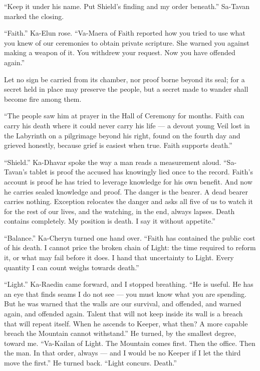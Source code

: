 ``Keep it under his name. Put Shield's finding and my order beneath.'' Sa-Tavan marked the closing.\par

``Faith.'' Ka-Elun rose. ``Va-Maera of Faith reported how you tried to use what you knew of our ceremonies to obtain private scripture. She warned you against making a weapon of it. You withdrew your request. Now you have offended again.''\par

\begin{scripture}
Let no sign be carried from its chamber, nor proof borne beyond its seal; for a secret held in place may preserve the people, but a secret made to wander shall become fire among them.
\end{scripture}

``The people saw him at prayer in the Hall of Ceremony for months. Faith can carry his death where it could never carry his life --- a devout young Veil lost in the Labyrinth on a pilgrimage beyond his right, found on the fourth day and grieved honestly, because grief is easiest when true. Faith supports death.''\par

``Shield.'' Ka-Dhavar spoke the way a man reads a measurement aloud. ``Sa-Tavan's tablet is proof the accused has knowingly lied once to the record. Faith's account is proof he has tried to leverage knowledge for his own benefit. And now he carries sealed knowledge and proof. The danger is the bearer. A dead bearer carries nothing. Exception relocates the danger and asks all five of us to watch it for the rest of our lives, and the watching, in the end, always lapses. Death contains completely. My position is death. I say it without appetite.''\par

``Balance.'' Ka-Cheryn turned one hand over. ``Faith has contained the public cost of his death. I cannot price the broken chain of Light: the time required to reform it, or what may fail before it does. I hand that uncertainty to Light. Every quantity I can count weighs towards death.''\par

``Light.'' Ka-Raedin came forward, and I stopped breathing. ``He is useful. He has an eye that finds seams I do not see --- you must know what you are spending. But he was warned that the walls are our survival, and offended, and warned again, and offended again. Talent that will not keep inside its wall is a breach that will repeat itself. When he ascends to Keeper, what then? A more capable breach the Mountain cannot withstand.'' He turned, by the smallest degree, toward me. ``Va-Kailan of Light. The Mountain comes first. Then the office. Then the man. In that order, always --- and I would be no Keeper if I let the third move the first.'' He turned back. ``Light concurs. Death.''\par

